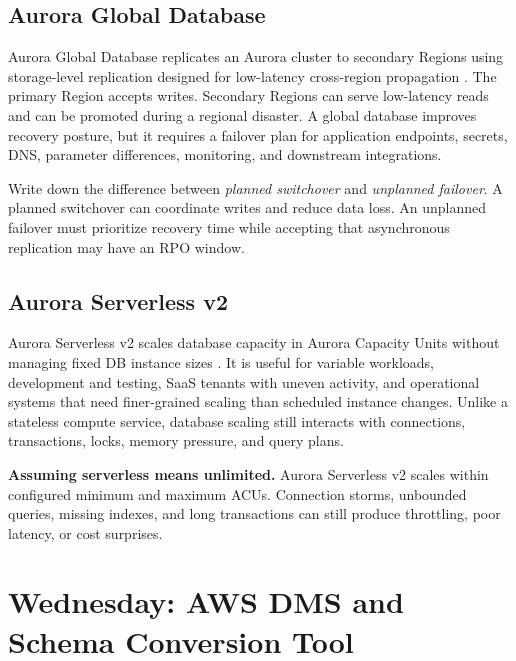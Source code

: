 \subsection{Aurora Global Database}
Aurora Global Database replicates an Aurora cluster to secondary Regions using storage-level replication designed for low-latency cross-region propagation \cite{awsAuroraGlobalDatabase}. The primary Region accepts writes. Secondary Regions can serve low-latency reads and can be promoted during a regional disaster. A global database improves recovery posture, but it requires a failover plan for application endpoints, secrets, DNS, parameter differences, monitoring, and downstream integrations.

\begin{tipbox}
Write down the difference between \emph{planned switchover} and \emph{unplanned failover}. A planned switchover can coordinate writes and reduce data loss. An unplanned failover must prioritize recovery time while accepting that asynchronous replication may have an RPO window.
\end{tipbox}

\subsection{Aurora Serverless v2}
Aurora Serverless v2 scales database capacity in Aurora Capacity Units without managing fixed DB instance sizes \cite{awsAuroraServerlessV2}. It is useful for variable workloads, development and testing, SaaS tenants with uneven activity, and operational systems that need finer-grained scaling than scheduled instance changes. Unlike a stateless compute service, database scaling still interacts with connections, transactions, locks, memory pressure, and query plans.

\begin{pitfall}
\textbf{Assuming serverless means unlimited.} Aurora Serverless v2 scales within configured minimum and maximum ACUs. Connection storms, unbounded queries, missing indexes, and long transactions can still produce throttling, poor latency, or cost surprises.
\end{pitfall}

\section{Wednesday: AWS DMS and Schema Conversion Tool}
